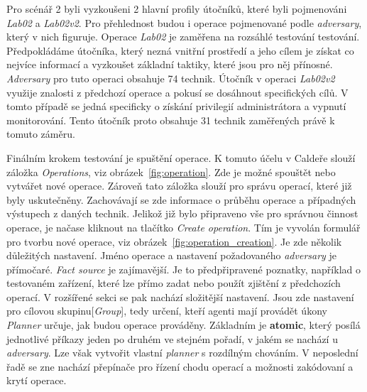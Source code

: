 Pro scénář 2 byli vyzkoušeni 2 hlavní profily útočníků, které byli pojmenováni \textit{Lab02} a \textit{Lab02v2}.
Pro přehlednost budou i operace pojmenované podle \textit{adversary}, který v nich figuruje.
Operace \textit{Lab02} je zaměřena na rozsáhlé testování testování.
Předpokládáme útočníka, který nezná vnitřní prostředí a jeho cílem je získat co nejvíce informací a vyzkoušet základní taktiky, které jsou pro něj přínosné.
\textit{Adversary} pro tuto operaci obsahuje 74 technik.
Útočník v operaci \textit{Lab02v2} využije znalosti z předchozí operace a pokusí se dosáhnout specifických cílů.
V tomto případě se jedná specificky o získání privilegií administrátora a vypnutí monitorování.
Tento útočník proto obsahuje 31 technik zaměřených právě k tomuto záměru.


Finálním krokem testování je spuštění operace.
K tomuto účelu v Caldeře slouží záložka \textit{Operations}, viz obrázek~\ref{fig:operation}.
Zde je možné spouštět nebo vytvářet nové operace.
Zároveň tato záložka slouží pro správu operací, které již byly uskutečněny.
Zachovávají se zde informace o průběhu operace a případných výstupech z daných technik.
Jelikož již bylo připraveno vše pro správnou činnost operace, je načase kliknout na tlačítko \textit{Create operation}.
Tím je vyvolán formulář pro tvorbu nové operace, viz obrázek~\ref{fig:operation_creation}.
Je zde několik důležitých nastavení.
Jméno operace a nastavení požadovaného \textit{adversary} je přímočaré.
\textit{Fact source} je zajímavější.
Je to předpřipravené poznatky, například o testovaném zařízení, které lze přímo zadat nebo použít zjištění z předchozích operací.
V rozšířené sekci se pak nachází složitější nastavení.
Jsou zde nastavení pro cílovou skupinu[\textit{Group}], tedy určení, kteří agenti mají provádět úkony
\textit{Planner} určuje, jak budou operace prováděny.
Základním je \textbf{atomic}, který posílá jednotlivé příkazy jeden po druhém ve stejném pořadí, v jakém se nachází u \textit{adversary}.
Lze však vytvořit vlastní \textit{planner} s rozdílným chováním\cite{mitre_caldera_docs}.
V neposlední řadě se zne nachází přepínače pro řízení chodu operací a možnosti zakódovaní a krytí operace.

